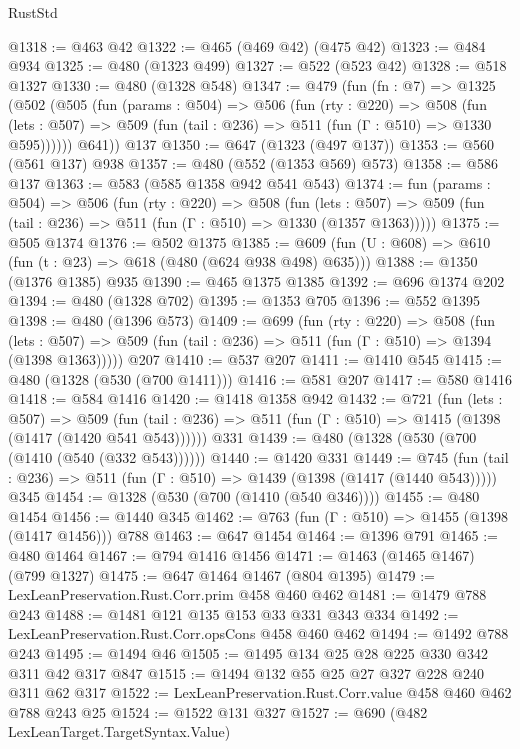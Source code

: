 \begin{lexlean}{RustStd}
\begin{coremodule}
@1318 := @463 @42
@1322 := @465 (@469 @42) (@475 @42)
@1323 := @484 @934
@1325 := @480 (@1323 @499)
@1327 := @522 (@523 @42)
@1328 := @518 @1327
@1330 := @480 (@1328 @548)
@1347 := @479
    (fun (fn : @7) =>
    @1325
      (@502
        (@505
          (fun (params : @504) =>
          @506
            (fun (rty : @220) =>
            @508
              (fun (lets : @507) =>
              @509 (fun (tail : @236) => @511 (fun (Γ : @510) => @1330 @595))))))
        @641))
    @137
@1350 := @647 (@1323 (@497 @137))
@1353 := @560 (@561 @137) @938
@1357 := @480 (@552 (@1353 @569) @573)
@1358 := @586 @137
@1363 := @583 (@585 @1358 @942 @541 @543)
@1374 := fun (params : @504) =>
  @506
    (fun (rty : @220) =>
    @508
      (fun (lets : @507) =>
      @509 (fun (tail : @236) => @511 (fun (Γ : @510) => @1330 (@1357 @1363)))))
@1375 := @505 @1374
@1376 := @502 @1375
@1385 := @609 (fun (U : @608) => @610 (fun (t : @23) => @618 (@480 (@624 @938 @498) @635)))
@1388 := @1350 (@1376 @1385) @935
@1390 := @465 @1375 @1385
@1392 := @696 @1374 @202
@1394 := @480 (@1328 @702)
@1395 := @1353 @705
@1396 := @552 @1395
@1398 := @480 (@1396 @573)
@1409 := @699
    (fun (rty : @220) =>
    @508
      (fun (lets : @507) =>
      @509 (fun (tail : @236) => @511 (fun (Γ : @510) => @1394 (@1398 @1363)))))
    @207
@1410 := @537 @207
@1411 := @1410 @545
@1415 := @480 (@1328 (@530 (@700 @1411)))
@1416 := @581 @207
@1417 := @580 @1416
@1418 := @584 @1416
@1420 := @1418 @1358 @942
@1432 := @721
    (fun (lets : @507) =>
    @509 (fun (tail : @236) => @511 (fun (Γ : @510) => @1415 (@1398 (@1417 (@1420 @541 @543))))))
    @331
@1439 := @480 (@1328 (@530 (@700 (@1410 (@540 (@332 @543))))))
@1440 := @1420 @331
@1449 := @745
    (fun (tail : @236) => @511 (fun (Γ : @510) => @1439 (@1398 (@1417 (@1440 @543)))))
    @345
@1454 := @1328 (@530 (@700 (@1410 (@540 @346))))
@1455 := @480 @1454
@1456 := @1440 @345
@1462 := @763 (fun (Γ : @510) => @1455 (@1398 (@1417 @1456))) @788
@1463 := @647 @1454
@1464 := @1396 @791
@1465 := @480 @1464
@1467 := @794 @1416 @1456
@1471 := @1463 (@1465 @1467) (@799 @1327)
@1475 := @647 @1464 @1467 (@804 @1395)
@1479 := LexLeanPreservation.Rust.Corr.prim @458 @460 @462
@1481 := @1479 @788 @243
@1488 := @1481 @121 @135 @153 @33 @331 @343 @334
@1492 := LexLeanPreservation.Rust.Corr.opsCons @458 @460 @462
@1494 := @1492 @788 @243
@1495 := @1494 @46
@1505 := @1495 @134 @25 @28 @225 @330 @342 @311 @42 @317 @847
@1515 := @1494 @132 @55 @25 @27 @327 @228 @240 @311 @62 @317
@1522 := LexLeanPreservation.Rust.Corr.value @458 @460 @462 @788 @243 @25
@1524 := @1522 @131 @327
@1527 := @690 (@482 LexLeanTarget.TargetSyntax.Value)

\end{coremodule}
\end{lexlean}
